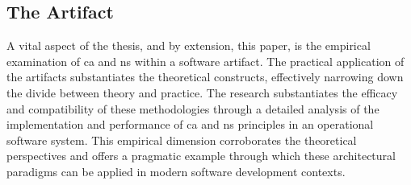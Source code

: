 \subsection{The Artifact}
A vital aspect of the thesis, and by extension, this paper, is the empirical examination of
\gls{ca} and \gls{ns} within a software artifact. The practical application of the
artifacts substantiates the theoretical constructs, effectively narrowing down the divide
between theory and practice. The research substantiates the efficacy and compatibility
of these methodologies through a detailed analysis of the implementation and performance
of \gls{ca} and \gls{ns} principles in an operational software system. This empirical
dimension corroborates the theoretical perspectives and offers a pragmatic example through
which these architectural paradigms can be applied in modern software development
contexts.
